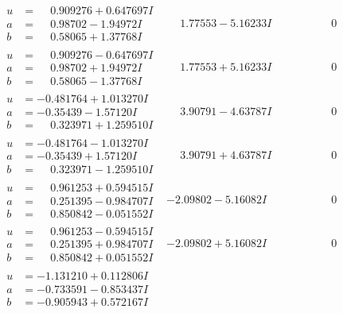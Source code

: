\documentclass[1p]{elsarticle_modified}
\theoremstyle{definition}
\begin{document}
$$\begin{array}{c|c|c}
\begin{aligned}
u &= \phantom{-}0.909276 + 0.647697 I \\
a &= \phantom{-}0.98702 - 1.94972 I \\
b &= \phantom{-}0.58065 + 1.37768 I\end{aligned}
 & \phantom{-}1.77553 - 5.16233 I & \phantom{-0.000000 } 0 \\ \hline\begin{aligned}
u &= \phantom{-}0.909276 - 0.647697 I \\
a &= \phantom{-}0.98702 + 1.94972 I \\
b &= \phantom{-}0.58065 - 1.37768 I\end{aligned}
 & \phantom{-}1.77553 + 5.16233 I & \phantom{-0.000000 } 0 \\ \hline\begin{aligned}
u &= -0.481764 + 1.013270 I \\
a &= -0.35439 - 1.57120 I \\
b &= \phantom{-}0.323971 + 1.259510 I\end{aligned}
 & \phantom{-}3.90791 - 4.63787 I & \phantom{-0.000000 } 0 \\ \hline\begin{aligned}
u &= -0.481764 - 1.013270 I \\
a &= -0.35439 + 1.57120 I \\
b &= \phantom{-}0.323971 - 1.259510 I\end{aligned}
 & \phantom{-}3.90791 + 4.63787 I & \phantom{-0.000000 } 0 \\ \hline\begin{aligned}
u &= \phantom{-}0.961253 + 0.594515 I \\
a &= \phantom{-}0.251395 - 0.984707 I \\
b &= \phantom{-}0.850842 - 0.051552 I\end{aligned}
 & -2.09802 - 5.16082 I & \phantom{-0.000000 } 0 \\ \hline\begin{aligned}
u &= \phantom{-}0.961253 - 0.594515 I \\
a &= \phantom{-}0.251395 + 0.984707 I \\
b &= \phantom{-}0.850842 + 0.051552 I\end{aligned}
 & -2.09802 + 5.16082 I & \phantom{-0.000000 } 0 \\ \hline\begin{aligned}
u &= -1.131210 + 0.112806 I \\
a &= -0.733591 - 0.853437 I \\
b &= -0.905943 + 0.572167 I\end{aligned}

\end{array}$$
\end{document}
